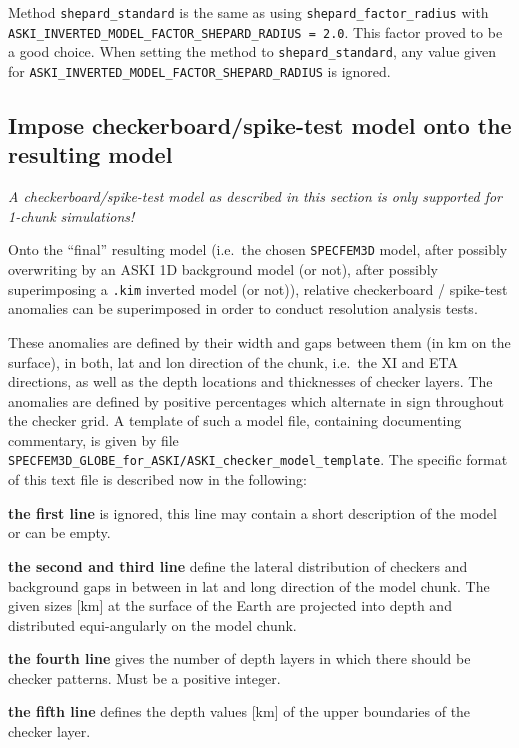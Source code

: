 \documentclass[12pt,a4paper]{article}
\newcommand{\lcode}[1]{\nolinkurl{#1}}
\newcommand{\ASKI}{ {\ttfamily ASKI} }
\begin{document}
Method \lcode{shepard_standard} is the same as using \lcode{shepard_factor_radius} with \lcode{ASKI_INVERTED_MODEL_FACTOR_SHEPARD_RADIUS = 2.0}.
This factor proved to be a good choice. When setting the method to \lcode{shepard_standard}, any value given for 
\lcode{ASKI_INVERTED_MODEL_FACTOR_SHEPARD_RADIUS} is ignored.

\subsection{Impose checkerboard/spike-test model onto the resulting model} \label{import_model:ssec_checker}
\emph{A checkerboard/spike-test model as described in this section is only supported for 1-chunk simulations!}

Onto the ``final'' resulting model (i.e.\ the chosen \lcode{SPECFEM3D} model, after possibly overwriting by an 
\ASKI 1D background model (or not), after possibly superimposing a \lcode{.kim} inverted model (or not)), 
relative checkerboard / spike-test anomalies can be superimposed in order to conduct resolution analysis tests.

These anomalies are defined by their width and gaps between them (in km on the surface), in both, lat 
and lon direction of the chunk, i.e.\ the XI and ETA directions, as well as the depth locations and thicknesses
of checker layers. The anomalies are defined by positive percentages which alternate in sign throughout the 
checker grid.
A template of such a model file, containing documenting commentary, is given by file 
\lcode{SPECFEM3D_GLOBE_for_ASKI/ASKI_checker_model_template}.
The specific format of this text file is described now in the following:

{\bf the first line} is ignored, this line may contain a short description of the model or can be empty.

{\bf the second and third line} define the lateral distribution of checkers and background gaps in between
in lat and long direction of the model chunk. The given sizes [km] at the surface of the Earth are projected 
into depth and distributed equi-angularly on the model chunk.

{\bf the fourth line} gives the number of depth layers in which there should be checker patterns. 
Must be a positive integer.

{\bf the fifth line} defines the depth values [km] of the upper boundaries of the checker layer.
\end{document}
